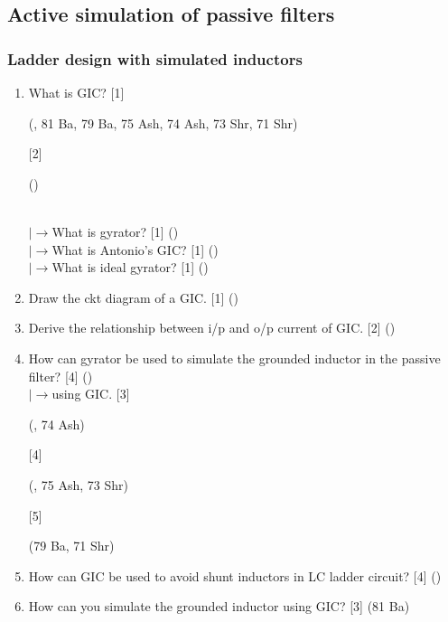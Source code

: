 \documentclass[12pt]{article}
\newcommand{\lb}{\\$\left|\rightarrow\right.$}
\begin{document}
	\subsection{Active simulation of passive filters}
		\subsubsection{Ladder design with simulated inductors}
			\begin{enumerate}[topsep=0pt]
				\item What is GIC? \hfill [1] \begin{footnotesize} (, 81 Ba, 79 Ba, 75 Ash, 74 Ash, 73 Shr, 71 Shr) \end{footnotesize} [2] \begin{footnotesize} () \end{footnotesize}				 
				\lb What is gyrator? \hfill [1] ()
				\lb What is Antonio's GIC? \hfill [1] ()
				\lb What is ideal gyrator? \hfill [1] ()

				\item Draw the ckt diagram of a GIC. \hfill [1] ()

				\item Derive the relationship between i/p and o/p current of GIC. \hfill [2] ()

				\item How can gyrator be used to simulate the grounded inductor in the passive filter? \hfill [4] ()
				\lb using GIC. \hfill [3] \begin{footnotesize} (, 74 Ash) \end{footnotesize} [4] \begin{footnotesize} (, 75 Ash, 73 Shr) \end{footnotesize} [5] \begin{footnotesize} (79 Ba, 71 Shr) \end{footnotesize}

				\item How can GIC be used to avoid shunt inductors in LC ladder circuit? \hfill [4] ()
				
				\item How can you simulate the grounded inductor using GIC? \hfill [3] (81 Ba)
				

\end{enumerate}
\end{document}
